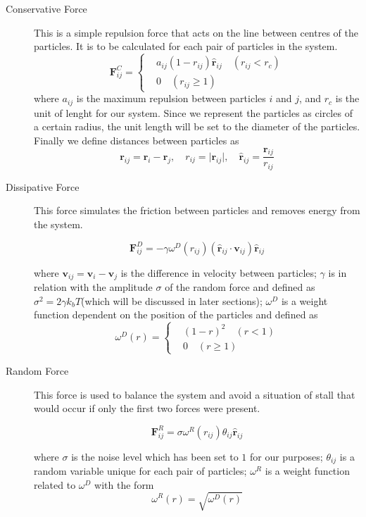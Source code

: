 \documentclass[]{usiinfbachelorproject}
\begin{document}
\begin{description}
    \item[Conservative Force] This is a simple repulsion force that acts on the line between centres of the particles. It is to be calculated 
    for each pair of particles in the system.
    \begin{equation}
        \textbf{F}^C_{ij} = \left\{
            \begin{aligned}
              & a_{ij}(1 - r_{ij})\hat{\textbf{r}}_{ij} \quad (r_{ij} < r_c)\\
              & 0 \quad (r_{ij} \geq 1)
            \end{aligned}
          \right.
    \end{equation}
    where $a_{ij}$ is the maximum repulsion between particles $i$ and $j$, and $r_c$ is the unit of 
    lenght for our system. Since we represent the particles as circles of a certain radius, the unit 
    length will be set to the diameter of the particles. Finally we define distances between particles as 
    $$\textbf{r}_{ij} = \textbf{r}_i - \textbf{r}_j, \quad r_{ij} = \vert \textbf{r}_{ij} \vert, \quad \hat{\textbf{r}}_{ij} = \frac{\textbf{r}_{ij}}{r_{ij}}$$
    \item[Dissipative Force] This force simulates the friction between particles and removes energy from the system.
    \item[] 
    $$\textbf{F}^D_{ij} = - \gamma \omega^D(r_{ij})(\hat{\textbf{r}}_{ij} \cdot \textbf{v}_{ij})\hat{\textbf{r}}_{ij}$$

    where $\textbf{v}_{ij} = \textbf{v}_i - \textbf{v}_j$ is the difference in velocity between particles; $\gamma$ is in relation with the amplitude 
    $\sigma$ of the random force and defined as $\sigma^2 = 2 \gamma k_b T$(which will be discussed in later sections); $\omega^D$ is a weight function 
    dependent on the position of the particles and defined as 
    \begin{equation}
        \omega^D (r) = \left\{
            \begin{aligned}
              & (1 - r)^2 \quad (r < 1)\\
              & 0 \quad (r \geq 1)
            \end{aligned}
          \right.
    \end{equation}
    \item[Random Force] This force is used to balance the system and avoid a situation of stall that would occur if only the 
    first two forces were present.

    $$\textbf{F}^R_{ij} = \sigma \omega^R(r_{ij})\theta_{ij}\hat{\textbf{r}}_{ij}$$

    where $\sigma$ is the noise level which has been set to $1$ for our purposes; $\theta_{ij}$ is a random variable unique for each pair of particles; 
    $\omega^R$ is a weight function related to $\omega^D$ with the form 
    $$\omega^R (r) = \sqrt {\omega^D (r)}$$

\end{description}
\end{document}
